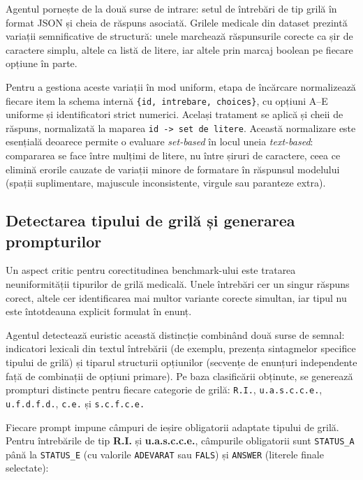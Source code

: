 \documentclass[12pt, a4paper, oneside, romanian]{teza-upb}
\begin{document}
Agentul pornește de la două surse de intrare: setul de întrebări de tip grilă în format JSON și cheia de răspuns asociată. Grilele medicale din dataset prezintă variații semnificative de structură: unele marchează răspunsurile corecte ca șir de caractere simplu, altele ca listă de litere, iar altele prin marcaj boolean pe fiecare opțiune în parte.

Pentru a gestiona aceste variații în mod uniform, etapa de încărcare normalizează fiecare item la schema internă \texttt{\{id, intrebare, choices\}}, cu opțiuni A--E uniforme și identificatori strict numerici. Același tratament se aplică și cheii de răspuns, normalizată la maparea \texttt{id -> set de litere}. Această normalizare este esențială deoarece permite o evaluare \textit{set-based} în locul uneia \textit{text-based}: compararea se face între mulțimi de litere, nu între șiruri de caractere, ceea ce elimină erorile cauzate de variații minore de formatare în răspunsul modelului (spații suplimentare, majuscule inconsistente, virgule sau paranteze extra).

\subsection{Detectarea tipului de grilă și generarea prompturilor}

Un aspect critic pentru corectitudinea benchmark-ului este tratarea neuniformității tipurilor de grilă medicală. Unele întrebări cer un singur răspuns corect, altele cer identificarea mai multor variante corecte simultan, iar tipul nu este întotdeauna explicit formulat în enunț.

Agentul detectează euristic această distincție combinând două surse de semnal: indicatori lexicali din textul întrebării (de exemplu, prezența sintagmelor specifice tipului de grilă) și tiparul structurii opțiunilor (secvențe de enunțuri independente față de combinații de opțiuni primare). Pe baza clasificării obținute, se generează prompturi distincte pentru fiecare categorie de grilă: \texttt{R.I.}, \texttt{u.a.s.c.c.e.}, \texttt{u.f.d.f.d.}, \texttt{c.e.} și \texttt{s.c.f.c.e.}



Fiecare prompt impune câmpuri de ieșire obligatorii adaptate tipului de grilă. Pentru întrebările de tip \textbf{R.I.} și \textbf{u.a.s.c.c.e.}, câmpurile obligatorii sunt \texttt{STATUS\_A} până la \texttt{STATUS\_E} (cu valorile \texttt{ADEVARAT} sau \texttt{FALS}) și \texttt{ANSWER} (literele finale selectate):
\end{document}
